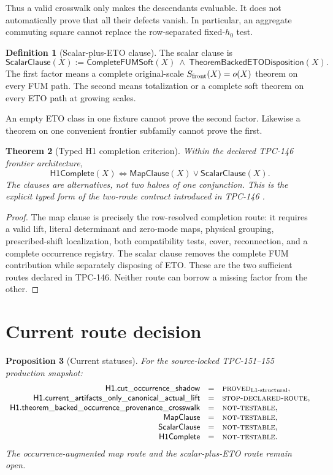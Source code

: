 \documentclass[11pt]{article}
\newtheorem{theorem}{Theorem}[section]
\newtheorem{proposition}[theorem]{Proposition}
\theoremstyle{definition}
\newtheorem{definition}[theorem]{Definition}
\theoremstyle{remark}
\numberwithin{equation}{section}
\newcommand{\Lone}{\mathrm{L1}}
\newcommand{\PROVED}{\textnormal{\textsc{proved}}}
\newcommand{\STOP}{\textnormal{\textsc{stop-declared-route}}}
\newcommand{\NT}{\textnormal{\textsc{not-testable}}}
\begin{document}
Thus a valid crosswalk only makes the descendants evaluable.  It does
not automatically prove that all their defects vanish.  In
particular, an aggregate commuting square cannot replace the
row-separated fixed-\(h_0\) test.

\begin{definition}[Scalar-plus-ETO clause]
\label{def:scalarclause}
The scalar clause is
\[
 \mathsf{ScalarClause}(X)
 :=
 \mathsf{CompleteFUMSoft}(X)
 \ \land\
 \mathsf{TheoremBackedETODisposition}(X).
\]
The first factor means a complete original-scale
\(S_{\rm front}(X)=o(X)\) theorem on every FUM path.  The second means
totalization or a complete soft theorem on every ETO path at growing
scales.
\end{definition}

An empty ETO class in one fixture cannot prove the second factor.
Likewise a theorem on one convenient frontier subfamily cannot prove
the first.

\begin{theorem}[Typed H1 completion criterion]
\label{thm:h1}
Within the declared TPC-146 frontier architecture,
\[
 \boxed{
 \mathsf{H1Complete}(X)
 \Longleftrightarrow
 \mathsf{MapClause}(X)\lor\mathsf{ScalarClause}(X).}
\]
The clauses are alternatives, not two halves of one conjunction.
This is the explicit typed form of the two-route contract introduced
in TPC-146 \citep{WangTPC146}.
\end{theorem}

\begin{proof}
The map clause is precisely the row-resolved completion route:
it requires a valid lift, literal determinant and zero-mode maps,
physical grouping, prescribed-shift localization, both compatibility
tests, cover, reconnection, and a complete occurrence registry.
The scalar clause removes the complete FUM contribution while
separately disposing of ETO.  These are the two sufficient routes
declared in TPC-146.  Neither route can borrow a missing factor from
the other.
\end{proof}

\section{Current route decision}

\begin{proposition}[Current statuses]
\label{prop:statuses}
For the source-locked TPC-151--155 production snapshot:
\[
\begin{array}{rcl}
\mathsf{H1.cut\_occurrence\_shadow}
  &=&\PROVED_{\Lone\text{-structural}},\\
\mathsf{H1.current\_artifacts\_only\_canonical\_actual\_lift}
  &=&\STOP,\\
\mathsf{H1.theorem\_backed\_occurrence\_provenance\_crosswalk}
  &=&\NT,\\
\mathsf{MapClause}&=&\NT,\\
\mathsf{ScalarClause}&=&\NT,\\
\mathsf{H1Complete}&=&\NT.
\end{array}
\]
The occurrence-augmented map route and the scalar-plus-ETO route
remain open.
\end{proposition}
\end{document}
